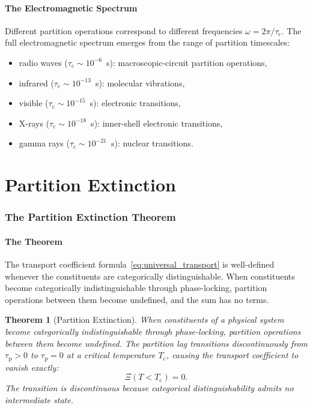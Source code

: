 \documentclass[twocolumn,10pt,a4paper]{article}
\newtheorem{theorem}{Theorem}[section]
\theoremstyle{definition}
\theoremstyle{remark}
\newcommand{\Tcrit}{T_{\mathrm{c}}}
\newcommand{\tauP}{\tau_{\mathrm{p}}}
\newcommand{\tauC}{\tau_{\mathrm{c}}}
\newcommand{\Transp}{\Xi}
\begin{document}
\subsection{The Electromagnetic Spectrum}

Different partition operations correspond to different frequencies $\omega = 2\pi/\tauC$. The full electromagnetic spectrum emerges from the range of partition timescales:
\begin{itemize}[leftmargin=1.2em,nosep]
\item radio waves ($\tauC \sim 10^{-6}$~s): macroscopic-circuit partition operations,
\item infrared ($\tauC \sim 10^{-13}$~s): molecular vibrations,
\item visible ($\tauC \sim 10^{-15}$~s): electronic transitions,
\item X-rays ($\tauC \sim 10^{-18}$~s): inner-shell electronic transitions,
\item gamma rays ($\tauC \sim 10^{-21}$~s): nuclear transitions.
\end{itemize}

\part{Partition Extinction}

\section{The Partition Extinction Theorem}
\label{sec:extinction}

\subsection{The Theorem}

The transport coefficient formula~\eqref{eq:universal_transport} is well-defined whenever the constituents are categorically distinguishable. When constituents become categorically indistinguishable through phase-locking, partition operations between them become undefined, and the sum has no terms.

\begin{theorem}[Partition Extinction]
\label{thm:extinction}
When constituents of a physical system become categorically indistinguishable through phase-locking, partition operations between them become undefined. The partition lag transitions discontinuously from $\tauP > 0$ to $\tauP = 0$ at a critical temperature $\Tcrit$, causing the transport coefficient to vanish exactly:
\begin{equation}
\Transp(T < \Tcrit) = 0.
\label{eq:extinction}
\end{equation}
The transition is discontinuous because categorical distinguishability admits no intermediate state.
\end{theorem}
\end{document}
